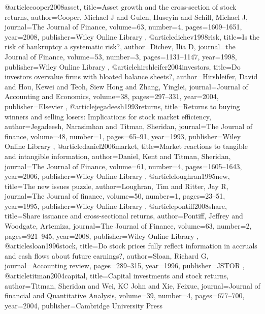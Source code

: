 @article{cooper2008asset,
  title={Asset growth and the cross-section of stock returns},
  author={Cooper, Michael J and Gulen, Huseyin and Schill, Michael J},
  journal={The Journal of Finance},
  volume={63},
  number={4},
  pages={1609--1651},
  year={2008},
  publisher={Wiley Online Library}
},
@article{dichev1998risk,
  title={Is the risk of bankruptcy a systematic risk?},
  author={Dichev, Ilia D},
  journal={the Journal of Finance},
  volume={53},
  number={3},
  pages={1131--1147},
  year={1998},
  publisher={Wiley Online Library}
},
@article{hirshleifer2004investors,
  title={Do investors overvalue firms with bloated balance sheets?},
  author={Hirshleifer, David and Hou, Kewei and Teoh, Siew Hong and Zhang, Yinglei},
  journal={Journal of Accounting and Economics},
  volume={38},
  pages={297--331},
  year={2004},
  publisher={Elsevier}
},
@article{jegadeesh1993returns,
  title={Returns to buying winners and selling losers: Implications for stock market efficiency},
  author={Jegadeesh, Narasimhan and Titman, Sheridan},
  journal={The Journal of finance},
  volume={48},
  number={1},
  pages={65--91},
  year={1993},
  publisher={Wiley Online Library}
},
@article{daniel2006market,
  title={Market reactions to tangible and intangible information},
  author={Daniel, Kent and Titman, Sheridan},
  journal={The Journal of Finance},
  volume={61},
  number={4},
  pages={1605--1643},
  year={2006},
  publisher={Wiley Online Library}
},
@article{loughran1995new,
  title={The new issues puzzle},
  author={Loughran, Tim and Ritter, Jay R},
  journal={The Journal of finance},
  volume={50},
  number={1},
  pages={23--51},
  year={1995},
  publisher={Wiley Online Library}
},
@article{pontiff2008share,
  title={Share issuance and cross-sectional returns},
  author={Pontiff, Jeffrey and Woodgate, Artemiza},
  journal={The Journal of Finance},
  volume={63},
  number={2},
  pages={921--945},
  year={2008},
  publisher={Wiley Online Library}
},
@article{sloan1996stock,
  title={Do stock prices fully reflect information in accruals and cash flows about future earnings?},
  author={Sloan, Richard G},
  journal={Accounting review},
  pages={289--315},
  year={1996},
  publisher={JSTOR}
},
@article{titman2004capital,
  title={Capital investments and stock returns},
  author={Titman, Sheridan and Wei, KC John and Xie, Feixue},
  journal={Journal of financial and Quantitative Analysis},
  volume={39},
  number={4},
  pages={677--700},
  year={2004},
  publisher={Cambridge University Press}
}